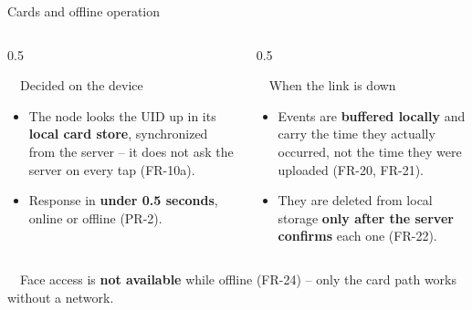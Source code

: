\documentclass[aspectratio=169, 10pt]{beamer}
\begin{document}
\begin{frame}{Cards and offline operation}
  \begin{columns}[T]
    \begin{column}{0.5\textwidth}
      \begin{goldcard}{\faIdCard~~Decided on the device}
        \scriptsize
        \begin{itemize}
          \item The node looks the UID up in its \textbf{local card store}, synchronized from the server -- it does not ask the server on every tap (FR-10a).
          \item Response in \textbf{under 0.5 seconds}, online or offline (PR-2).
        \end{itemize}
      \end{goldcard}
    \end{column}
    \begin{column}{0.5\textwidth}
      \begin{card}{\faWifi~~When the link is down}
        \scriptsize
        \begin{itemize}
          \item Events are \textbf{buffered locally} and carry the time they actually occurred, not the time they were uploaded (FR-20, FR-21).
          \item They are deleted from local storage \textbf{only after the server confirms} each one (FR-22).
        \end{itemize}
      \end{card}
    \end{column}
  \end{columns}
  \vspace{0.6em}
  \centering
  \begin{keybar}
    \faExclamationCircle~~Face access is \textbf{not available} while offline (FR-24) -- only the card path works without a network.
  \end{keybar}
\end{frame}
\end{document}
